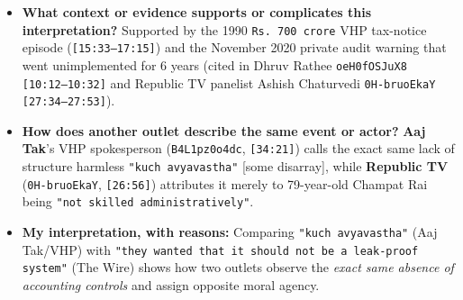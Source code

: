 \documentclass[10pt,a4paper]{article}
\begin{document}
\begin{itemize}[leftmargin=1.5em, itemsep=3pt, topsep=4pt]
  \item \textbf{What context or evidence supports or complicates this interpretation?} Supported by the 1990 \texttt{Rs.\,700 crore} VHP tax-notice episode (\texttt{[15:33--17:15]}) and the November 2020 private audit warning that went unimplemented for 6 years (cited in Dhruv Rathee \texttt{oeH0fOSJuX8} \texttt{[10:12--10:32]} and Republic TV panelist Ashish Chaturvedi \texttt{0H-bruoEkaY} \texttt{[27:34--27:53]}).
  \item \textbf{How does another outlet describe the same event or actor?} \textbf{Aaj Tak}'s VHP spokesperson (\texttt{B4L1pz0o4dc}, \texttt{[34:21]}) calls the exact same lack of structure harmless \texttt{"kuch avyavastha"} [some disarray], while \textbf{Republic TV} (\texttt{0H-bruoEkaY}, \texttt{[26:56]}) attributes it merely to 79-year-old Champat Rai being \texttt{"not skilled administratively"}.
  \item \textbf{My interpretation, with reasons:} Comparing \texttt{"kuch avyavastha"} (Aaj Tak/VHP) with \texttt{"they wanted that it should not be a leak-proof system"} (The Wire) shows how two outlets observe the \textit{exact same absence of accounting controls} and assign opposite moral agency.
\end{itemize}
\end{document}
